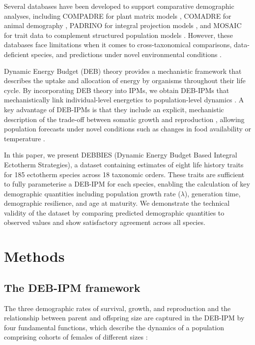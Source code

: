 \documentclass[11pt]{article}
\begin{document}
Several databases have been developed to support comparative demographic analyses, including COMPADRE for plant matrix models \citep{salguero2015}, COMADRE for animal demography \citep{salguero2016b}, PADRINO for integral projection models \citep{levin2022}, and MOSAIC for trait data to complement structured population models \citep{maag2023}. However, these databases face limitations when it comes to cross-taxonomical comparisons, data-deficient species, and predictions under novel environmental conditions \citep{kissling2018, schneider2020}.

Dynamic Energy Budget (DEB) theory \citep{kooijman2010, kooijmanbook2010} provides a mechanistic framework that describes the uptake and allocation of energy by organisms throughout their life cycle. By incorporating DEB theory into IPMs, we obtain DEB-IPMs that mechanistically link individual-level energetics to population-level dynamics \citep{smallegange2017, kooijman2019, nisbet2000}. A key advantage of DEB-IPMs is that they include an explicit, mechanistic description of the trade-off between somatic growth and reproduction \citep{smallegange2023, kooijman1984}, allowing population forecasts under novel conditions such as changes in food availability or temperature \citep{angilletta1997, coulson2021}.

In this paper, we present DEBBIES (Dynamic Energy Budget Based Integral Ectotherm Strategies), a dataset containing estimates of eight life history traits for 185 ectotherm species across 18 taxonomic orders. These traits are sufficient to fully parameterise a DEB-IPM for each species, enabling the calculation of key demographic quantities including population growth rate ($\lambda$), generation time, demographic resilience, and age at maturity. We demonstrate the technical validity of the dataset by comparing predicted demographic quantities to observed values and show satisfactory agreement across all species.

\section{Methods}

\subsection{The DEB-IPM framework}

The three demographic rates of survival, growth, and reproduction and the relationship between parent and offspring size are captured in the DEB-IPM by four fundamental functions, which describe the dynamics of a population comprising cohorts of females of different sizes \citep{smallegange2017, deRoos2000, easterling2000}:
\end{document}
